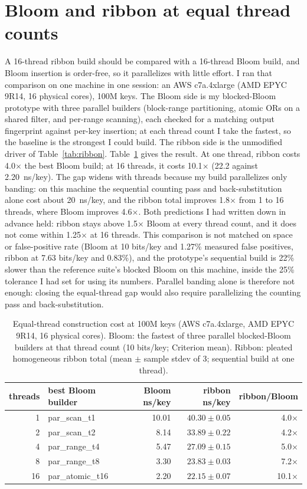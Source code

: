\documentclass[a4paper,UKenglish,cleveref,autoref,thm-restate,anonymous]{lipics-v2021}
\begin{document}
\section{Bloom and ribbon at equal thread counts}\label{app:efour}
A 16-thread ribbon build should be compared with
a 16-thread Bloom build, and Bloom insertion is order-free, so it parallelizes with little effort.
I ran that comparison on one machine in one
session: an AWS c7a.4xlarge (AMD EPYC 9R14, 16 physical cores), 100M keys. The Bloom side is my
blocked-Bloom prototype with three parallel builders (block-range partitioning, atomic ORs on a
shared filter, and per-range scanning), each checked for a matching output fingerprint against per-key insertion; at
each thread count I take the fastest, so the baseline is the strongest I could build. The ribbon
side is the unmodified driver of Table~\ref{tab:ribbon}. Table~\ref{tab:efour} gives the result.
At one thread, ribbon costs 4.0$\times$ the best Bloom build; at 16 threads, it costs
10.1$\times$ (22.2 against 2.20~ns/key). The gap widens with
threads because my build parallelizes only banding: on this machine the sequential counting pass
and back-substitution alone cost about 20~ns/key, and the ribbon total improves 1.8$\times$ from
1 to 16 threads, where Bloom improves 4.6$\times$. Both predictions I had written down in advance
held: ribbon stays above 1.5$\times$ Bloom at every thread count, and it does not come within
1.25$\times$ at 16 threads. This comparison is not matched on space or false-positive rate (Bloom
at 10 bits/key and 1.27\% measured false positives, ribbon at 7.63 bits/key and 0.83\%), and the
prototype's sequential build is 22\% slower than the reference suite's blocked Bloom on this
machine, inside the 25\% tolerance I had set for using its numbers. Parallel banding alone is therefore not enough: closing the equal-thread gap would also require parallelizing the counting pass and
back-substitution.

\begin{table}
\caption{Equal-thread construction cost at 100M keys (AWS c7a.4xlarge, AMD EPYC 9R14, 16 physical cores). Bloom: the fastest of three parallel
blocked-Bloom builders at that thread count (10 bits/key; Criterion mean). Ribbon: pleated
homogeneous ribbon total (mean $\pm$ sample stdev of 3; sequential build at one thread).}
\label{tab:efour}
\begin{tabular}{rlrrr}
\toprule
threads & best Bloom builder & Bloom ns/key & ribbon ns/key & ribbon/Bloom \\
\midrule
1 & par\_scan\_t1 & 10.01 & $40.30\pm0.05$ & 4.0$\times$ \\
2 & par\_scan\_t2 & 8.14 & $33.89\pm0.22$ & 4.2$\times$ \\
4 & par\_range\_t4 & 5.47 & $27.09\pm0.15$ & 5.0$\times$ \\
8 & par\_range\_t8 & 3.30 & $23.83\pm0.03$ & 7.2$\times$ \\
16 & par\_atomic\_t16 & 2.20 & $22.15\pm0.07$ & 10.1$\times$ \\
\bottomrule
\end{tabular}
\end{table}
\end{document}
